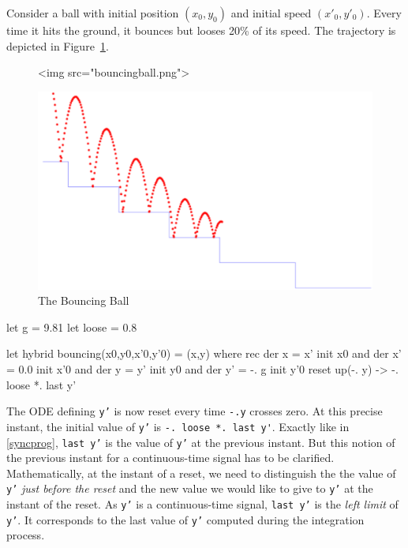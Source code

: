 \documentclass[11pt,titlepage,twoside]{report}
\makeatletter
\newcommand{\zls}[1]{{\@span{class="zelusinline"}#1}}
\newcommand{\zls}[1]{\texttt{#1}}
\renewcommand{\zls}[1]{\texttt{#1}}
\makeatother
\begin{document}
Consider a ball with initial position $(x_0, y_0)$ and initial speed
$(x'_0, y'_0)$. Every time it hits the ground, it bounces but looses
20\% of its speed. The trajectory is depicted in 
Figure~\cref{bouncing-ball}.

\begin{figure}
\begin{center}
\ifhevea
\begin{rawhtml}
<img src="bouncingball.png">
\end{rawhtml}
\else
\includegraphics[width=.7\textwidth]{Fig/bouncingball}
\fi
\end{center}
\caption{The Bouncing Ball~\label{bouncing-ball}}
\end{figure}

\begin{chklisting}[label=gravity]
let g = 9.81
let loose = 0.8
\end{chklisting}
\begin{chklisting}
let hybrid bouncing(x0,y0,x'0,y'0) = (x,y) where
 rec der x = x' init x0
 and der x' = 0.0 init x'0
 and der y = y' init y0
 and der y' = -. g init y'0 reset up(-. y) -> -. loose *. last y'
\end{chklisting}

The ODE defining \zls{y'} is now reset every time \zls{-.y}
crosses zero.  At this precise instant, the initial value of \zls{y'}
is \verb+-. loose *. last y'+. Exactly like in
\cref{syncprog}, \zls{last y'} is the
value of \zls{y'} at the previous instant. But this notion of the
previous instant for a continuous-time signal has to be
clarified. Mathematically, at the instant of a reset, we need to
distinguish the the value of \zls{y'} \emph{just before the reset}
and the new value we would like to give to \zls{y'} at the instant of
the reset. As \zls{y'} is a continuous-time signal, \zls{last
  y'} is the \emph{left limit} of \zls{y'}. It corresponds to the
last value of \zls{y'} computed during the integration process.
\end{document}
